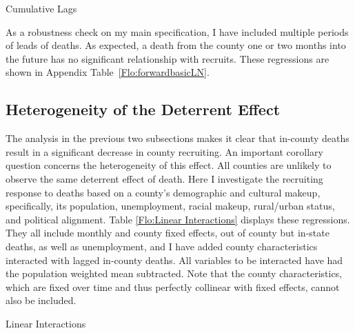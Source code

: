 \documentclass[12pt] {article}
\begin{document}
\begin{table}
\caption{Cumulative Lags}
\label{Flo:Cumulative LagsLN}
\scalebox{0.75}{}
\end{table}

As a robustness check on my main specification, I have included multiple periods of leads of deaths. As expected, a death from the county one or two months into the future has no significant relationship with recruits. These regressions are shown in Appendix Table~\ref{Flo:forwardbasicLN}. 

\subsection{Heterogeneity of the Deterrent Effect\label{sub:interactions}}

The analysis in the previous two subsections makes it clear that in-county
deaths result in a significant decrease in county recruiting. An important
corollary question concerns the heterogeneity of this effect.
All counties are unlikely to observe the same deterrent effect of
death. Here I investigate the recruiting response to deaths based
on a county's demographic and cultural makeup, specifically, its population,
unemployment, racial makeup, rural/urban status, and political alignment.
Table \ref{Flo:Linear Interactions} displays these regressions.
They all include monthly and county fixed effects, out of county but
in-state deaths, as well as unemployment, and I have added county
characteristics interacted with lagged in-county deaths. All variables
to be interacted have had the population weighted mean subtracted. %
Note that the county characteristics, which are fixed over time and thus perfectly collinear with fixed effects, cannot also be included.

\begin{table}
\caption{Linear Interactions}
\label{Flo:Linear Interactions}
\end{table}
\end{document}
